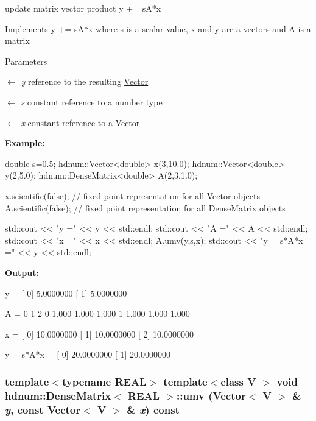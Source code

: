 update matrix vector product y += sA$\ast$x 

Implements y += sA$\ast$x where s is a scalar value, x and y are a vectors and A is a matrix


\begin{DoxyParams}{Parameters}
\item[\mbox{$\leftarrow$} {\em y}]reference to the resulting \hyperlink{classhdnum_1_1Vector}{Vector} \item[\mbox{$\leftarrow$} {\em s}]constant reference to a number type \item[\mbox{$\leftarrow$} {\em x}]constant reference to a \hyperlink{classhdnum_1_1Vector}{Vector}\end{DoxyParams}
{\bfseries Example:} 
\begin{DoxyCode}
  double s=0.5;
  hdnum::Vector<double> x(3,10.0);
  hdnum::Vector<double> y(2,5.0);
  hdnum::DenseMatrix<double> A(2,3,1.0);

  x.scientific(false); // fixed point representation for all Vector objects
  A.scientific(false); // fixed point representation for all DenseMatrix objects

  std::cout << "y =" << y << std::endl;
  std::cout << "A =" << A << std::endl;
  std::cout << "x =" << x << std::endl;
  A.umv(y,s,x);
  std::cout << "y = s*A*x =" << y << std::endl;
\end{DoxyCode}


{\bfseries Output:} \begin{DoxyVerb}
y =
[ 0]      5.0000000
[ 1]      5.0000000

A =
                      0          1          2 
          0       1.000      1.000      1.000 
          1       1.000      1.000      1.000 

x =
[ 0]     10.0000000
[ 1]     10.0000000
[ 2]     10.0000000

y = s*A*x =
[ 0]     20.0000000
[ 1]     20.0000000
	  \end{DoxyVerb}
 \hypertarget{classhdnum_1_1DenseMatrix_a7c179eb4b54a828bf8624f3222f710ce}{
\subsubsection[{umv}]{\setlength{\rightskip}{0pt plus 5cm}template$<$typename REAL$>$ template$<$class V $>$ void {\bf hdnum::DenseMatrix}$<$ REAL $>$::umv ({\bf Vector}$<$ V $>$ \& {\em y}, \/  const {\bf Vector}$<$ V $>$ \& {\em x}) const}}
\label{classhdnum_1_1DenseMatrix_a7c179eb4b54a828bf8624f3222f710ce}


